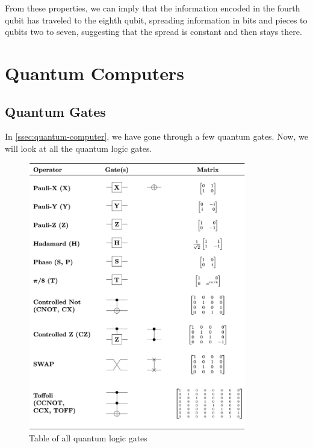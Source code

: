 \documentclass[11pt, oneside, listof=totoc]{scrbook}
\begin{document}
From these properties, we can imply that the information encoded in the fourth qubit has traveled to the eighth qubit, spreading information in bits and pieces to qubits two to seven, suggesting that the spread is constant and then stays there.


\appendix

\chapter{Quantum Computers}

\section{Quantum Gates}

In \cref{ssec:quantum-computer}, we have gone through a few quantum gates. Now, we will look at all the quantum logic gates.
\begin{figure}[H]
    \centering
    \includegraphics[width=0.85\textwidth]{Quantum_Logic_Gates.png}
    \caption[Table of all quantum logic gates]{Table of all quantum logic gates\protect\footnotemark}
    \label{fig:quantum-logic-gates}
\end{figure}
\end{document}
